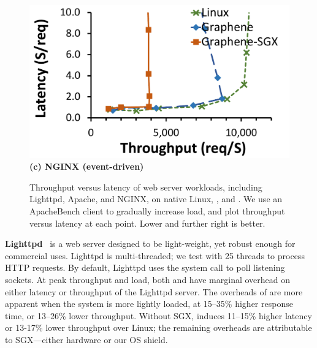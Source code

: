 \begin{figure}[t!]
\begin{minipage}{.45\textwidth}
\centering
\footnotesize
\vspace{6pt}
\includegraphics[width=\linewidth]{sgx/nginx-throughput-latency}\\
\vspace{3pt}
{\bf (c) NGINX (event-driven)}
\vspace{6pt}
\end{minipage}

\caption{Throughput versus latency of web server workloads, including Lighttpd, Apache, and NGINX, on native Linux, \graphene{}, and \graphenesgx{}.
We use an ApacheBench client to gradually increase load, and plot
throughput versus latency at each point.  Lower and further right
is better.
}
\label{fig:server-throughput-latency}
\end{figure}


{\bf Lighttpd}~\cite{lighttpd} is a web server designed to be light-weight, yet robust enough for commercial uses. 
Lighttpd is multi-threaded; we test with 25 threads to process HTTP requests. 
By default, Lighttpd uses the  system call to poll listening sockets.
At peak throughput and load,  both \graphene{} and \graphenesgx{} have marginal overhead on either latency or throughput of the Lighttpd server.
The overheads of \graphene{} are more apparent when the system
is more lightly loaded, at 
15--35\% higher response time, or 13--26\% lower throughput. 
Without SGX, \graphene{} induces 
11--15\% higher latency or 13-17\% lower throughput over Linux;
the remaining overheads are attributable to SGX---either hardware or our OS shield.


